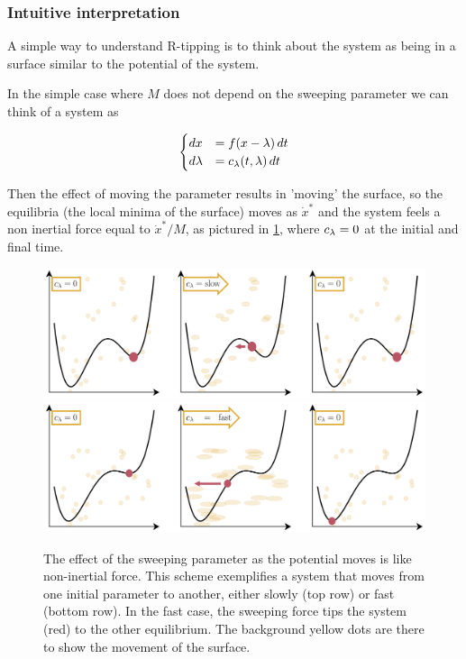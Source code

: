 \subsubsection{Intuitive interpretation}

A simple way to understand R-tipping is to think about the system as being in a surface similar to the potential of the system.
 
In the simple case where $M$ does not depend on the sweeping parameter we can think of a system as  

\begin{equation}
	\begin{cases}
		d x&=f(x-\lambda) \, dt\\
		d \lambda&= c_\lambda(t,\lambda)\, dt
	\end{cases}
	\label{eq:Aug2}
\end{equation}

Then the effect of  moving the parameter results in 'moving' the surface, so the equilibria (the local minima of the surface) moves as $\dot x^*$ and the system feels a non inertial force equal to  $\dot x^*/M$, as pictured in \cref{fig:slow}, where $c_\lambda=0$ at the initial and final time. 

\begin{figure}[bt]
	\centering
	\includegraphics[width=\linewidth]{Images/Metrics/acceleration/slow}
	\includegraphics[width=\linewidth]{Images/Metrics/acceleration/fast}
	\caption{The effect of the sweeping parameter as the potential moves is like non-inertial force.  This scheme exemplifies a system that moves from one initial parameter to another, either slowly (top row) or fast (bottom row). In the fast case, the sweeping force tips the system (red) to the other equilibrium. The background yellow dots are there to show the movement of the surface.}
	\label{fig:slow}
\end{figure}

